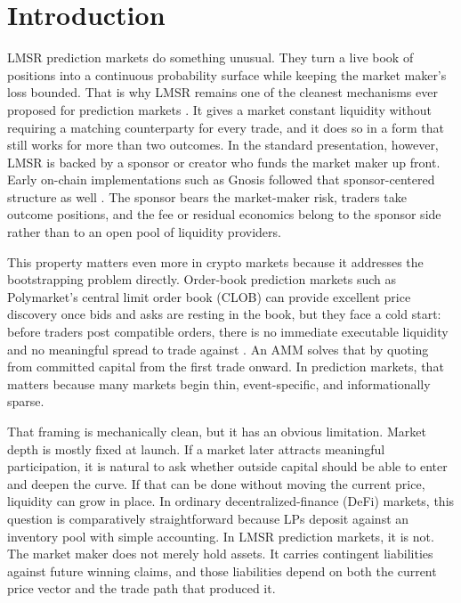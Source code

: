 \documentclass[10pt]{article}
\begin{document}
\section{Introduction}

LMSR prediction markets do something unusual. They turn a live book of positions into a continuous probability surface while keeping the market maker's loss bounded. That is why LMSR remains one of the cleanest mechanisms ever proposed for prediction markets \cite{hanson2002}. It gives a market constant liquidity without requiring a matching counterparty for every trade, and it does so in a form that still works for more than two outcomes. In the standard presentation, however, LMSR is backed by a sponsor or creator who funds the market maker up front. Early on-chain implementations such as Gnosis followed that sponsor-centered structure as well \cite{gnosisstandard}. The sponsor bears the market-maker risk, traders take outcome positions, and the fee or residual economics belong to the sponsor side rather than to an open pool of liquidity providers.

This property matters even more in crypto markets because it addresses the bootstrapping problem directly. Order-book prediction markets such as Polymarket's central limit order book (CLOB) can provide excellent price discovery once bids and asks are resting in the book, but they face a cold start: before traders post compatible orders, there is no immediate executable liquidity and no meaningful spread to trade against \cite{polymarketclob}. An AMM solves that by quoting from committed capital from the first trade onward. In prediction markets, that matters because many markets begin thin, event-specific, and informationally sparse.

That framing is mechanically clean, but it has an obvious limitation. Market depth is mostly fixed at launch. If a market later attracts meaningful participation, it is natural to ask whether outside capital should be able to enter and deepen the curve. If that can be done without moving the current price, liquidity can grow in place. In ordinary decentralized-finance (DeFi) markets, this question is comparatively straightforward because LPs deposit against an inventory pool with simple accounting. In LMSR prediction markets, it is not. The market maker does not merely hold assets. It carries contingent liabilities against future winning claims, and those liabilities depend on both the current price vector and the trade path that produced it.
\end{document}
